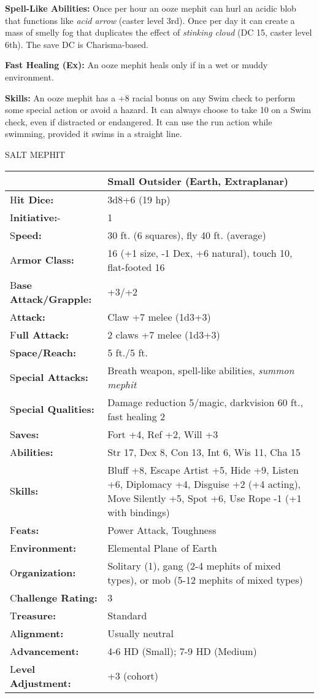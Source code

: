 \documentclass{article}
\begin{document}
\textbf{Spell-Like Abilities: }Once per hour an ooze mephit can hurl an acidic 
blob that functions like \textit{acid arrow }(caster level 3rd). Once per day it 
can create a mass of smelly fog that duplicates the effect of \textit{stinking 
cloud }(DC 15, caster level 6th). The save DC is Charisma-based.

\textbf{Fast Healing (Ex):} An ooze mephit heals only if in a wet or muddy environment.

\textbf{Skills:} An ooze mephit has a +8 racial bonus on any Swim check to perform 
some special action or avoid a hazard. It can always choose to take 10 on a Swim 
check, even if distracted or endangered. It can use the run action while swimming, 
provided it swims in a straight line.

\vspace{12pt}
SALT MEPHIT

\begin{tabular}{|>{\raggedright}p{88pt}|>{\raggedright}p{238pt}|}
\hline
 & Small Outsider (Earth, Extraplanar)\tabularnewline
\hline
H\textbf{it Dice:} & 3d8+6 (19 hp)\tabularnewline
\hline
I\textbf{nitiative:}- & 1\tabularnewline
\hline
S\textbf{peed:} & 30 ft. (6 squares), fly 40 ft. (average)\tabularnewline
\hline
A\textbf{rmor Class:} & 16 (+1 size, -1 Dex, +6 natural), touch 10, flat-footed 
16\tabularnewline
\hline
B\textbf{ase Attack/Grapple:} & +3/+2\tabularnewline
\hline
A\textbf{ttack:} & Claw +7 melee (1d3+3)\tabularnewline
\hline
F\textbf{ull Attack:} & 2 claws +7 melee (1d3+3)\tabularnewline
\hline
S\textbf{pace/Reach:} & 5 ft./5 ft.\tabularnewline
\hline
S\textbf{pecial Attacks:} & Breath weapon, spell-like abilities, \textit{summon 
mephit}\tabularnewline
\hline
S\textbf{pecial Qualities:} & Damage reduction 5/magic, darkvision 60 ft., fast 
healing 2\tabularnewline
\hline
S\textbf{aves:} & Fort +4, Ref +2, Will +3\tabularnewline
\hline
A\textbf{bilities:} & Str 17, Dex 8, Con 13, Int 6, Wis 11, Cha 15\tabularnewline
\hline
S\textbf{kills:} & Bluff +8, Escape Artist +5, Hide +9, Listen +6, Diplomacy +4, 
Disguise +2 (+4 acting), Move Silently +5, Spot +6, Use Rope -1 (+1 with bindings)\tabularnewline
\hline
F\textbf{eats:} & Power Attack, Toughness\tabularnewline
\hline
E\textbf{nvironment:} & Elemental Plane of Earth\tabularnewline
\hline
O\textbf{rganization:} & Solitary (1), gang (2-4 mephits of mixed types), or mob 
(5-12 mephits of mixed types)\tabularnewline
\hline
C\textbf{hallenge Rating:} & 3\tabularnewline
\hline
T\textbf{reasure:} & Standard\tabularnewline
\hline
A\textbf{lignment:} & Usually neutral\tabularnewline
\hline
A\textbf{dvancement:} & 4-6 HD (Small); 7-9 HD (Medium)\tabularnewline
\hline
L\textbf{evel Adjustment:} & +3 (cohort)\tabularnewline
\hline
\end{tabular}
\end{document}
